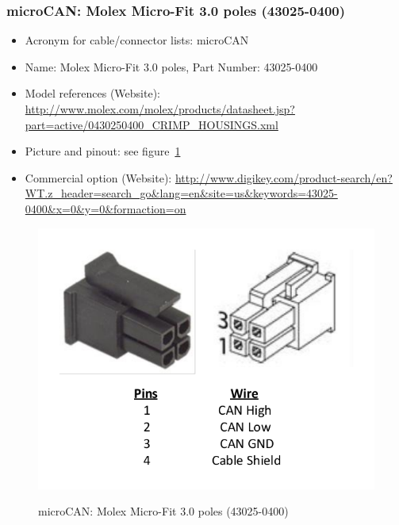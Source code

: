 \subsubsection{microCAN: Molex Micro-Fit 3.0 poles (43025-0400)} \label{DEVICE:microCAN}
\begin{itemize}
  \item Acronym for cable/connector lists: microCAN
  \item Name: Molex Micro-Fit 3.0 poles, Part Number: 43025-0400
  \item Model references (Website): \href{http://www.molex.com/molex/products/datasheet.jsp?part=active/0430250400\_CRIMP\_HOUSINGS.xml}{http://www.molex.com/molex/products/datasheet.jsp?part=active/0430250400\_CRIMP\_HOUSINGS.xml}
  \item Picture and pinout: see figure~\ref{FIG:DEVICEmicroCAN}
  \item Commercial option (Website): \href{http://www.digikey.com/product-search/en?WT.z\_header=search\_go\&lang=en\&site=us\&keywords=43025-0400\&x=0\&y=0\&formaction=on}{http://www.digikey.com/product-search/en?WT.z\_header=search\_go\&lang=en\&site=us\&keywords=43025-0400\&x=0\&y=0\&formaction=on}
\end{itemize}
\begin{figure}
  \centering
  \includegraphics[angle=90,width=1\columnwidth]{figs/body02/FIGDEVICEmicroCAN.pdf}\\
  \caption[microCAN: Molex Micro-Fit 3.0 poles (43025-0400)]{microCAN: Molex Micro-Fit 3.0 poles (43025-0400)}
  \label{FIG:DEVICEmicroCAN}
\end{figure}

